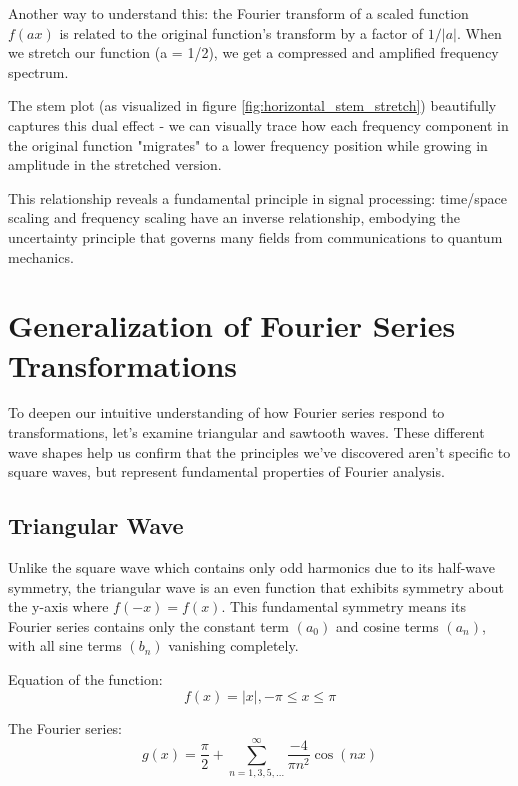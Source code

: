 \documentclass{article}
\begin{document}
Another way to understand this: the Fourier transform of a scaled function $f(ax)$ is related to the original function's transform by a factor of $1/|a|$. When we stretch our function (a = 1/2), we get a compressed and amplified frequency spectrum.
\vspace{0.2in}

The stem plot (as visualized in figure \ref{fig:horizontal_stem_stretch}) beautifully captures this dual effect - we can visually trace how each frequency component in the original function "migrates" to a lower frequency position while growing in amplitude in the stretched version.
\vspace{0.2in}

This relationship reveals a fundamental principle in signal processing: time/space scaling and frequency scaling have an inverse relationship, embodying the uncertainty principle that governs many fields from communications to quantum mechanics.

\section{Generalization of Fourier Series Transformations}

To deepen our intuitive understanding of how Fourier series respond to transformations, let's examine triangular and sawtooth waves. These different wave shapes help us confirm that the principles we've discovered aren't specific to square waves, but represent fundamental properties of Fourier analysis.

\subsection{Triangular Wave}

Unlike the square wave which contains only odd harmonics due to its half-wave symmetry, the triangular wave  is an even function that exhibits symmetry about the y-axis where $f(-x) = f(x)$. This fundamental symmetry means its Fourier series contains only the constant term $(a_0)$ and cosine terms $(a_n)$, with all sine terms $(b_n)$ vanishing completely.
\vspace{0.2in}

Equation of the function:
\begin{equation}
f(x) = |x|,  -\pi \leq x \leq \pi
\end{equation}

The Fourier series:
$$g(x) = \frac{\pi}{2} +\sum_{n=1,3,5,...}^{\infty}\frac{-4}{\pi n^2}\cos(nx)$$
\end{document}
